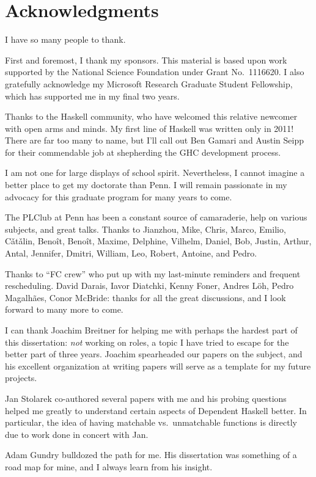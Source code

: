 \chapter*{Acknowledgments}

I have so many people to thank.

First and foremost, I thank my sponsors. This material is based upon work supported by the National Science Foundation
under Grant No.~1116620. I also gratefully acknowledge my Microsoft
Research Graduate Student Fellowship, which has supported me in my
final two years.

Thanks to the Haskell community, who have welcomed this
relative newcomer with open arms and minds. My first line of Haskell
was written only in 2011!
There are far too many
to name, but I'll call out Ben Gamari and Austin Seipp for their
commendable job at shepherding the GHC development process.

I am not one for large displays of school spirit. Nevertheless,
I cannot imagine a better place to get my doctorate than Penn.
I will remain passionate in my advocacy for this graduate program
for many years to come.

The PLClub at Penn has been a constant source of camaraderie, help
on various subjects, and great talks. Thanks to Jianzhou, Mike, Chris,
Marco, Emilio, C\v{a}t\v{a}lin, Beno\^{i}t, Beno\^{i}t, Maxime, Delphine,
Vilhelm, Daniel, Bob, Justin, Arthur, Antal, Jennifer, Dmitri, William,
Leo, Robert, Antoine, and Pedro.

Thanks to ``FC crew'' who put up with my last-minute reminders and
frequent rescheduling. David Darais, Iavor Diatchki, Kenny Foner,
 Andres L\"{o}h, Pedro Magalh\~{a}es, Conor McBride: thanks for all the great
discussions, and I look forward to many more to come.

I can thank Joachim Breitner for helping me with perhaps the hardest
part of this dissertation: \emph{not} working on roles, a topic I have
tried to escape for the better part of three years. Joachim spearheaded
our papers on the subject, and his excellent organization at writing papers
will serve as a template for my future projects.

Jan Stolarek co-authored several papers with me and his probing questions helped
me greatly to understand certain aspects of Dependent Haskell better. In particular,
the idea of having matchable vs.~unmatchable functions is directly due to work
done in concert with Jan.

Adam Gundry bulldozed the path for me. His dissertation was something of
a road map for mine, and I always learn from his insight.

